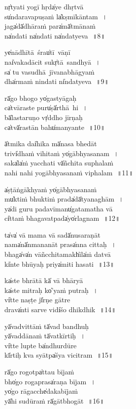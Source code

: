 \documentclass[parskip, DIV=14, pagenumber=head,top]{scrartcl}
\begin{document}
nṛ̍tyati yogī hṛ॒da̍ye dhṛtvā\\
su̍ndaravapuṣaṁ la̍kṣmīkāntam\,~।\\
ja॒ga̍dā̍dhāraṁ pa॒ra̍mā̍tmānaṁ\\
na̍ndati na̍ndati na̍ndatyeva\,~॥8॥

ye̍nādhītā śrau̍tī vāṇī\\
nai̍vakadācit su॒kṛ̍tā sandhyā\,~।\\
sa̍ tu vasudhā jīvanabhāgyaṁ\\
dha̍rmaṁ nindati ni̍ndatyeva\,~॥9॥

rā̍go bhogo yo̍gastyāgaḥ\\
ca̍tvāraste pu॒ru̍ṣā̍rthā hi\,~।\\
bā̍lastaruṇo vṛ̍ddho jīrṇaḥ\\
ca̍tvā̍rastān ba॒hu̍manyante\,~॥10॥

ā̍tmika॒ dai̍hika॒ mā̍nasa bhedāt\\
tri॒vi̍dhaṁ vihitaṁ yo̍gābhyasanam\,~।\\
sa॒ka̍la̍ṁ yacchati vā̍ñchita suphalaṁ\\
na॒hi nahi yogābhya॒sanaṁ viphalam\,~॥11॥

\newpage 
a̍ṣṭāṅgākhyaṁ yo̍gābhyasanaṁ\\
mu̍ktiṁ bhuktiṁ pra॒da̍dā̍tyanaghām\,~।\\
ya̍di guru padavīma॒nu̍gatamatha vā\\
ci̍ttaṁ bhagavatpa॒da̍yo̍rlagnam\,~॥12॥

ta̍va̍ vā mama vā sa॒dā̍nusaraṇāt\\
na॒ma̍nā̍nmananāt pra॒sa̍nna cittaḥ\,~।\\
bha॒ga̍va̍n vāñcchitama॒kh̍ila̍ṁ datvā\\
ki̍nte bhūyaḥ pri॒ya̍miti hasati\,~॥13॥

ka̍ste bhrātā kā̍ vā bhāryā\\
ka̍ste mitraḥ ko̍'yaṁ putraḥ\,~।\\
vi̍tte naṣṭe jī̍rṇe gātre\\
dra॒va̍nti sarve vi॒di̍śo dhikdhik\,~॥14॥

yā̍vadvittāṁ tā̍vad bandhuḥ\\
yā̍vaddānaṁ tā̍vatkīrtiḥ\,~।\\
vi̍tte lupte ba̍ndhurdūre\\
kī̍rtiḥ kva syātpa̍śya vicitram\,~॥15॥

rā̍go rogotpa̍ttau bījaṁ\\
bho̍go rogapra॒sa̍raṇa bījam\,~।\\ 
yo̍go rāgacche̍dakabījaṁ\\
yā̍hi sudūraṁ rā̍gātbhogāt\,~॥16॥
\end{document}
